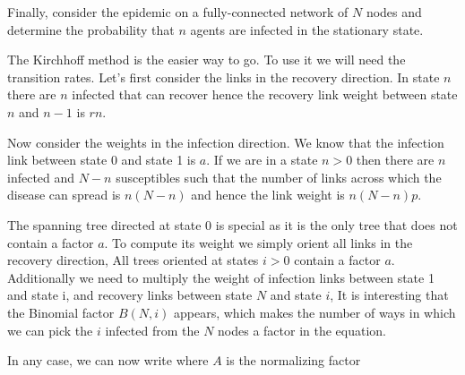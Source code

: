 \subquestion 
Finally, consider the epidemic on a fully-connected network of $N$ nodes and determine the probability that $n$ agents are infected in the stationary state.  

\solution 
The Kirchhoff method is the easier way to go. To use it we will need the transition rates. Let's first consider the links in the recovery direction. In state $n$ there are $n$ infected that can recover hence the recovery link weight between state $n$ and $n-1$ is $rn$. 

Now consider the weights in the infection direction. We know that the infection link between state 0 and state 1 is $a$. If we are in a state $n>0$ then there are $n$ infected and $N-n$ susceptibles such that the number of links across which the disease can spread is $n(N-n)$ and hence the link weight is $n(N-n)p$.

The spanning tree directed at state 0 is special as it is the only tree that does not contain a factor $a$. To compute its weight we simply orient all links in the recovery direction,
All trees oriented at states $i>0$ contain a factor $a$. Additionally we need to multiply the weight of infection links between state 1 and state i, and recovery links between state $N$ and state $i$,
It is interesting that the Binomial factor $B(N,i)$ appears, which makes the number of ways in which we can pick the $i$ infected from the $N$ nodes a factor in the equation. 

In any case, we can now write 
where $A$ is the normalizing factor
